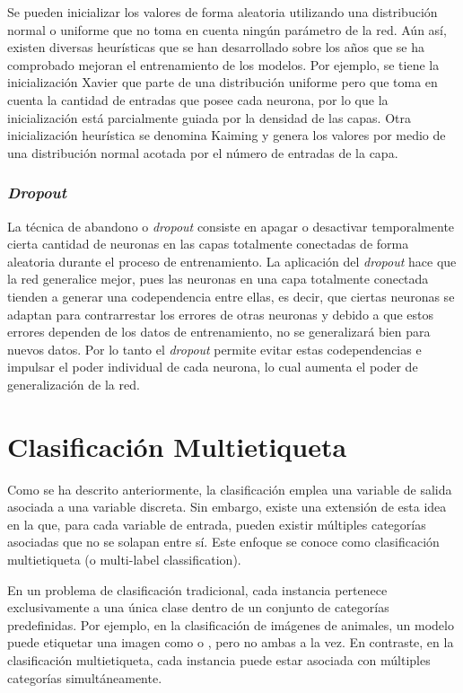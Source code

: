 Se pueden inicializar los valores de forma aleatoria utilizando una distribución normal o uniforme que no toma en cuenta ningún parámetro de la red. Aún así, existen diversas heurísticas que se han desarrollado sobre los años que se ha comprobado mejoran el entrenamiento de los modelos. Por ejemplo, se tiene la inicialización Xavier \cite{glorot2010understanding} que parte de una distribución uniforme pero que toma en cuenta la cantidad de entradas que posee cada neurona, por lo que la inicialización está parcialmente guiada por la densidad de las capas. Otra inicialización heurística se denomina Kaiming \cite{he2015delving} y genera los valores por medio de una distribución normal acotada por el número de entradas de la capa.

\subsubsection{\textit{Dropout}}
La técnica de abandono o \textit{dropout} \cite{10.5555/2627435.2670313} consiste en apagar o desactivar temporalmente cierta cantidad de neuronas en las capas totalmente conectadas de forma aleatoria durante el proceso de entrenamiento. La aplicación del \textit{dropout} hace que la red generalice mejor, pues las neuronas en una capa totalmente conectada tienden a generar una codependencia entre ellas, es decir, que ciertas neuronas se adaptan para contrarrestar los errores de otras neuronas y debido a que estos errores dependen de los datos de entrenamiento, no se generalizará bien para nuevos datos. Por lo tanto el \textit{dropout} permite evitar estas codependencias e impulsar el poder individual de cada neurona, lo cual aumenta el poder de generalización de la red.

\section{Clasificación Multietiqueta}
\label{section2:multilabel}
Como se ha descrito anteriormente, la clasificación emplea una variable de salida asociada a una variable discreta. Sin embargo, existe una extensión de esta idea en la que, para cada variable de entrada, pueden existir múltiples categorías asociadas que no se solapan entre sí. Este enfoque se conoce como clasificación multietiqueta (o multi-label classification).

En un problema de clasificación tradicional, cada instancia pertenece exclusivamente a una única clase dentro de un conjunto de categorías predefinidas. Por ejemplo, en la clasificación de imágenes de animales, un modelo puede etiquetar una imagen como  o , pero no ambas a la vez. En contraste, en la clasificación multietiqueta, cada instancia puede estar asociada con múltiples categorías simultáneamente.

